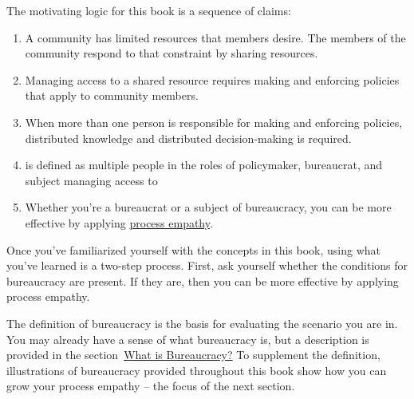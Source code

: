 The motivating logic for this book is a sequence of claims:
\begin{enumerate}
    \item A community has limited resources that members desire. The members of the community respond to that constraint by sharing resources.
    \item Managing access to a \gls{shared resource} 
    \iftoggle{glossaryinmargin}{\marginpar{[Glossary]}}{}%
    requires making and enforcing policies that apply to community members. 
    \item When more than one person is responsible for making and enforcing policies, distributed knowledge and distributed decision-making is required. 
    \item 
\iftoggle{glossarysubstitutionworks}{\Gls{bureaucracy}}{Bureaucracy}%
\iftoggle{glossaryinmargin}{\marginpar{[Glossary]}}{} is defined as multiple people in the roles of policymaker, bureaucrat, and subject managing access to 
\iftoggle{glossarysubstitutionworks}{\glspl{shared resource}.}{shared resources.} 
    \item Whether you're a \gls{bureaucrat} 
    \iftoggle{glossaryinmargin}{\marginpar{[Glossary]}}{}%
    or a subject of bureaucracy, you can be more effective by applying \hyperref[sec:process-empathy]{process empathy}.
\end{enumerate}

Once you've familiarized yourself with the concepts in this book, using what you've learned is a two-step process. First, ask yourself whether the conditions for bureaucracy are present. If they are, then you can be more effective by applying process empathy.

The definition of bureaucracy is the basis for evaluating the scenario you are in. You may already have a sense of what bureaucracy is, but a description is provided%
\iftoggle{haspagenumbers}{on page~\pageref{sec:define-bureaucracy}}{} 
in the section~\hyperref[sec:define-bureaucracy]{What is Bureaucracy?} To supplement the definition, illustrations of bureaucracy provided throughout this book show how you can grow your process empathy -- the focus of the next section. 